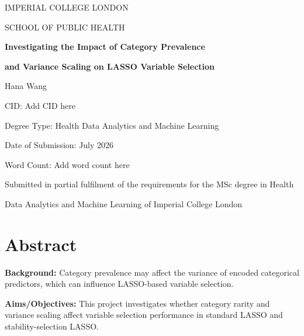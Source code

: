 \documentclass[12pt,a4paper,twoside]{report}
\newcommand{\reportauthor}{Hana Wang}
\newcommand{\cid}{Add CID here}
\newcommand{\degreetype}{Health Data Analytics and Machine Learning}
\newcommand{\submissiondate}{July 2026}
\newcommand{\wordcount}{Add word count here}
\begin{document}
\begin{titlepage}
    \centering

    {\Large IMPERIAL COLLEGE LONDON\par}
    \vspace{0.5cm}
    {\Large SCHOOL OF PUBLIC HEALTH\par}

    \vspace{3cm}

    {\LARGE\bfseries Investigating the Impact of Category Prevalence\par}
    \vspace{0.3cm}
    {\LARGE\bfseries and Variance Scaling on LASSO Variable Selection\par}

    \vspace{2cm}

    {\large \reportauthor\par}
    \vspace{0.4cm}
    {\large CID: \cid\par}
    \vspace{0.4cm}
    {\large Degree Type: \degreetype\par}
    \vspace{0.4cm}
    {\large Date of Submission: \submissiondate\par}
    \vspace{0.4cm}
    {\large Word Count: \wordcount\par}

    \vfill

    {\large Submitted in partial fulfilment of the requirements for the MSc degree in Health\par}
    {\large Data Analytics and Machine Learning of Imperial College London\par}
\end{titlepage}

\setcounter{page}{1}

\chapter*{Abstract}

\textbf{Background:} Category prevalence may affect the variance of encoded categorical predictors, which can influence LASSO-based variable selection.

\textbf{Aims/Objectives:} This project investigates whether category rarity and variance scaling affect variable selection performance in standard LASSO and stability-selection LASSO.
\end{document}
